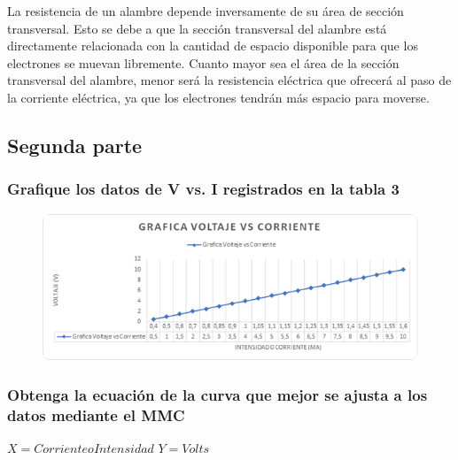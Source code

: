 \documentclass[10pt]{article}
\begin{document}
\begin{multicols}{2}
	La resistencia de un alambre depende inversamente de su área de sección
	transversal. Esto se debe a que la sección transversal del alambre está
	directamente relacionada con la cantidad de espacio disponible para que
	los electrones se muevan libremente. Cuanto mayor sea el área de la sección
	transversal del alambre, menor será la resistencia eléctrica que ofrecerá
	al paso de la corriente eléctrica, ya que los electrones tendrán más
	espacio para moverse.%

	\subsection{Segunda parte}

	\subsubsection*{Grafique los datos de V vs. I registrados en la tabla 3}

	\begin{figure}[H]
		\includegraphics[scale = .55]{./Images/Grafica.png}
	\end{figure}

	\subsubsection*{Obtenga la ecuación de la curva que mejor se ajusta a los datos mediante el MMC}

	$X = Corriente o Intensidad$	\hfill \break{}
	$Y = Volts$


\end{multicols}
\end{document}
